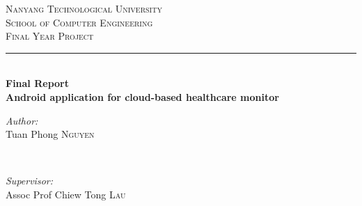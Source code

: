 \begin{titlepage}

\newcommand{\HRule}{\rule{\linewidth}{0.5mm}} %

\center %
 

\textsc{\LARGE Nanyang Technological University}\\[1.5cm] %
\textsc{\Large School of Computer Engineering}\\[0.5cm] %
\textsc{\large Final Year Project}\\[0.5cm] %


\HRule \\[0.4cm] { \huge \bfseries Final Report}\\[0.4cm] %
{ \huge \bfseries Android application for cloud-based healthcare monitor}\\[0.4cm] %
 

\begin{minipage}{0.4\textwidth}
    \begin{flushleft}
        \large \emph{Author:}\\ Tuan Phong
        \textsc{Nguyen} %
    \end{flushleft}
\end{minipage} ~
\begin{minipage}{0.4\textwidth}
    \begin{flushright}
        \large \emph{Supervisor:} \\ Assoc Prof Chiew Tong
        \textsc{Lau} %
    \end{flushright}
\end{minipage}


\end{titlepage}
